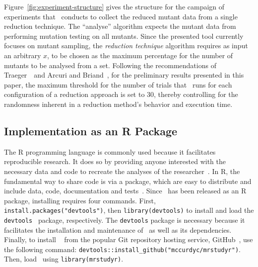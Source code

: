 Figure~\ref{fig:experiment-structure} gives the structure for the campaign of experiments that \mr~conducts to collect
the reduced mutant data from a single reduction technique. The ``analyse'' algorithm expects the mutant data
from performing mutation testing on all mutants. Since the presented tool currently focuses on mutant sampling, the
\textit{reduction technique} algorithm requires as input an arbitrary $x$, to be chosen as the maximum percentage
for the number of mutants to be analysed from a set. Following the recommendations of Traeger~\etal~and Arcuri and Briand~\cite{traeger2008nine, arcuri2014hitchhiker},
for the preliminary results presented in this paper, the maximum threshold for the number of trials that \mr~runs for each
configuration of a reduction approach is set to 30, thereby controlling for the randomness inherent in a reduction method's
behavior and execution time.

\subsection{Implementation as an R Package}

The R programming language is commonly used because it facilitates reproducible research. It does so by providing anyone interested with
the necessary data and code to recreate the analyses of the researcher~\cite{gentleman2012statistical}.  In R, the fundamental
way to share code is via a package, which are easy to distribute and include data, code, documentation and tests~\cite{wickham2015r}.
Since \mr~has been released as an R package, installing requires four commands.  First, \texttt{install.packages("devtools")},
then {\small\texttt{library(devtools)}} to install and load the {\small\texttt{devtools}}~\cite{devtools} package, respectively.
The \texttt{devtools} package is necessary because it facilitates the installation and maintenance of \mr~as well as its dependencies.
Finally, to install \mr~\cite{tool} from the popular Git repository hosting service, GitHub~\cite{github}, use the following command:
{\small\texttt{devtools::install\_github("mccurdyc/mrstudyr")}}.  Then, load \mr~using \texttt{library(mrstudyr)}.


